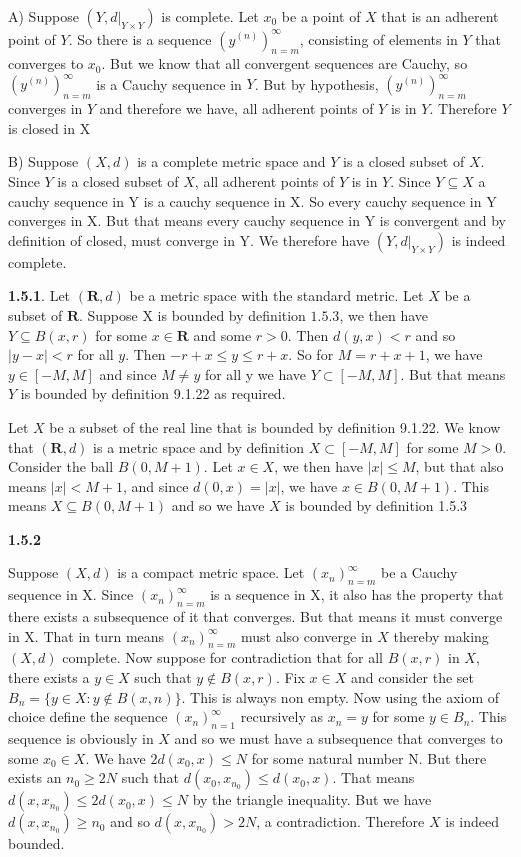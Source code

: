 \documentclass[12pt]{article}
\begin{document}
A) Suppose $(Y,d|_{Y\times Y})$ is complete. Let $x_0$ be a point of $X$ that is an adherent point of $Y$. So there is a sequence $(y^{(n)})_{n=m}^\infty$, consisting of elements in $Y$ that converges to $x_0$. But we know that all convergent sequences are Cauchy, so $(y^{(n)})_{n=m}^\infty$ is a Cauchy sequence in $Y$. But by hypothesis, $(y^{(n)})_{n=m}^\infty$ converges in $Y$ and therefore we have, all adherent points of $Y$ is in $Y$. Therefore $Y$ is closed in X

B) Suppose $(X,d)$ is a complete metric space and $Y$ is a closed subset of $X$. Since $Y$ is a closed subset of $X$, all adherent points of $Y$ is in $Y$. Since $Y\subseteq X$ a cauchy sequence in Y is a cauchy sequence in X. So every cauchy sequence in Y converges in X. But that means every cauchy sequence in Y is convergent and by definition of closed, must converge in Y. We therefore have $(Y,d|_{Y\times Y})$ is indeed complete. 

\textbf{1.5.1}.
Let $(\textbf{R},d)$ be a metric space with the standard metric. Let $X$ be a subset of $\textbf{R}$. Suppose X is bounded by definition $1.5.3$, we then have $Y\subseteq B(x,r)$ for some $x\in \textbf{R}$ and some $r>0$. Then $d(y,x) < r$ and so $|y-x| <r$ for all $y$. Then $-r+x\leq y \leq r+x$. So for $M = r+x+1$, we have $y\in [-M,M]$ and since $M \neq y$ for all y we have $Y\subset [-M,M]$. But that means $Y$ is bounded by definition 9.1.22 as required. 

Let $X$ be a subset of the real line that is bounded by definition 9.1.22. We know that $(\textbf{R},d)$ is a metric space and by definition $X\subset [-M,M]$ for some $M>0$. Consider the ball $B(0,M+1)$. Let $x\in X$, we then have $ |x| \leq M$, but that also means $|x|<M+1$, and since $d(0,x) = |x|$, we have $x\in B(0,M+1)$. This means $X\subseteq B(0,M+1)$ and so we have $X$ is bounded by definition 1.5.3

\textbf{1.5.2}

Suppose $(X,d)$ is a compact metric space. Let $(x_n)^\infty_{n=m}$ be a Cauchy sequence in X. Since $(x_n)^\infty_{n=m}$ is a sequence in X, it also has the property that there exists a subsequence of it that converges. But that means it must converge in X. That in turn means $(x_n)^\infty_{n=m}$ must also converge in $X$ thereby making $(X,d)$ complete. Now suppose for contradiction that for all $B(x,r)$ in $X$, there exists a $y\in X$ such that $y\notin B(x,r)$. Fix $x\in X$ and consider the set $B_n = \{y\in X: y\notin B(x,n)\}$. This is always non empty. Now using the axiom of choice define the sequence $(x_n)_{n=1}^\infty$ recursively as $x_n = y$ for some $y\in B_n$. This sequence is obviously in $X$ and so we must have a subsequence that converges to some $x_0\in X$. We have $2d(x_0,x) \leq N$ for some natural number N. But there exists an $n_0\geq 2N$ such that $ d(x_0,x_{n_0})\leq d(x_0,x)$. That means $d(x,x_{n_0})\leq 2d(x_0,x)\leq N$ by the triangle inequality. But we have $d(x,x_{n_0}) \geq n_0$ and so $d(x,x_{n_0})>2N$, a contradiction. Therefore $X$ is indeed bounded. 
\end{document}
